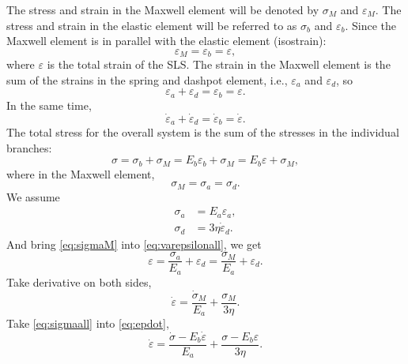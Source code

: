 \documentclass[12pt]{article}
\begin{document}
The stress and strain in the Maxwell element will be denoted by $\sigma_M$ and $\varepsilon_M$.
The stress and strain in the elastic element will be referred to as $\sigma_b$ and $\varepsilon_b$.
Since the Maxwell element is in parallel with the elastic element (isostrain):
\begin{equation}
  \varepsilon_M = \varepsilon_b = \varepsilon,
\end{equation}
where $\varepsilon$ is the total strain of the SLS.
The strain in the Maxwell element is the sum of the strains in the spring and dashpot element, i.e.,
$\varepsilon_a$ and $\varepsilon_d$, so
\begin{equation}\label{eq:varepsilonall}
  \varepsilon_a + \varepsilon_d = \varepsilon_b = \varepsilon.
\end{equation}
In the same time,
\begin{equation}
  \dot{\varepsilon}_a + \dot{\varepsilon}_d = \dot{\varepsilon}_b = \dot{\varepsilon}.
\end{equation}
The total stress for the overall system is the sum of the stresses in the individual branches:
\begin{equation}\label{eq:sigmaall}
  \sigma = \sigma_b + \sigma_M = E_b \varepsilon_b + \sigma_M = E_b \varepsilon + \sigma_M,
\end{equation}
where in the Maxwell element,
\begin{equation}
  \sigma_M = \sigma_a = \sigma_d.
\end{equation}
We assume
\begin{align}\label{eq:sigmaM}
  \sigma_a & = E_a \varepsilon_a,          \\
  \sigma_d & = 3 \eta \dot{\varepsilon}_d.
\end{align}
And bring \eqref{eq:sigmaM} into \eqref{eq:varepsilonall},
we get
\begin{equation}
  \varepsilon = \frac{ \sigma_a }{ E_a } + \varepsilon_d = \frac{ \sigma_M }{ E_a } + \varepsilon_d.
\end{equation}
Take derivative on both sides,
\begin{equation}\label{eq:epdot}
  \dot{\varepsilon} = \frac{ \dot{\sigma}_M }{ E_a } + \frac{ \sigma_M }{ 3 \eta }.
\end{equation}
Take \eqref{eq:sigmaall} into \eqref{eq:epdot},
\begin{equation}\label{eq:beforesimplify}
  \dot{\varepsilon} = \frac{ \dot{\sigma} - E_b \dot{\varepsilon} }{ E_a } + \frac{ \sigma - E_b \varepsilon }{ 3 \eta }.
\end{equation}
\end{document}
